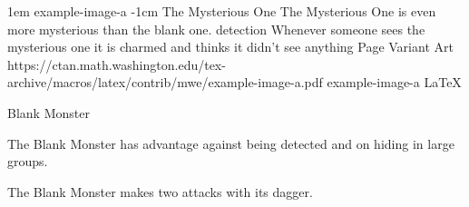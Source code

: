 \vfill\eject %

\MonsterVariant%
	{1em}%
	{example-image-a}%
	{-1cm} %
	{The Mysterious One}%
	{%
		The Mysterious One is even more mysterious than the blank one.
		detection
		Whenever someone sees the mysterious one it is charmed and thinks it didn't see anything
	}%
	{Page \thepage}%
	{Variant Art}%
	{https://ctan.math.washington.edu/tex-archive/macros/latex/contrib/mwe/example-image-a.pdf}%
	{example-image-a}%
	{LaTeX}%

\begin{DndMonster}[width=0.5\textwidth]{Blank Monster}

    \DndMonsterBasics[
        armor-class = {10},
        hit-points  = {\DndDice{1d12 + 6}},
        speed       = {30 ft., climb 25 ft.},
    ]

    \DndMonsterAbilityScores[
    ]

    \DndMonsterDetails[
        challenge = 1,
    ]
    
    The Blank Monster has advantage against being detected and on hiding in large groups.
	
	The Blank Monster makes two attacks with its dagger.
	
	\DndMonsterAttack[
      name=Dagger,
      distance=melee, %
      mod=+3,
      reach=10,
      targets=one target,
      dmg=\DndDice{1d8 + 2},
      dmg-type=slashing,
    ]
      
\end{DndMonster}

